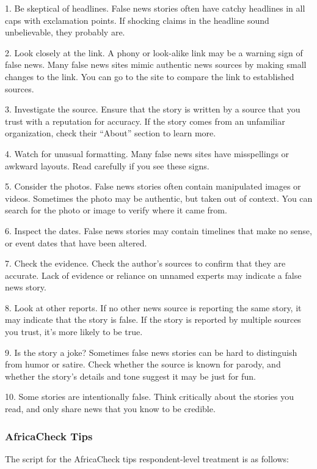 \documentclass[letterpaper, 12pt, parskip=full,]{scrartcl}
\begin{document}
1. Be skeptical of headlines. False news stories often have catchy headlines in all caps with exclamation points. If shocking claims in the headline sound unbelievable, they probably are.

2. Look closely at the link. A phony or look-alike link may be a warning sign of false news. Many false news sites mimic authentic news sources by making small changes to the link. You can go to the site to compare the link to established sources.

3. Investigate the source. Ensure that the story is written by a source that you trust with a reputation for accuracy. If the story comes from an unfamiliar organization, check their ``About'' section to learn more.

4. Watch for unusual formatting. Many false news sites have misspellings or awkward layouts. Read carefully if you see these signs.

5. Consider the photos. False news stories often contain manipulated images or videos. Sometimes the photo may be authentic, but taken out of context. You can search for the photo or image to verify where it came from.

6. Inspect the dates. False news stories may contain timelines that make no sense, or event dates that have been altered.

7. Check the evidence. Check the author's sources to confirm that they are accurate. Lack of evidence or reliance on unnamed experts may indicate a false news story.

8. Look at other reports. If no other news source is reporting the same story, it may indicate that the story is false. If the story is reported by multiple sources you trust, it's more likely to be true.

9. Is the story a joke? Sometimes false news stories can be hard to distinguish from humor or satire. Check whether the source is known for parody, and whether the story's details and tone suggest it may be just for fun.

10. Some stories are intentionally false. Think critically about the stories you read, and only share news that you know to be credible.



\subsubsection{AfricaCheck Tips}\label{sec:actips}
The script for the AfricaCheck tips respondent-level treatment is as follows:
\end{document}
